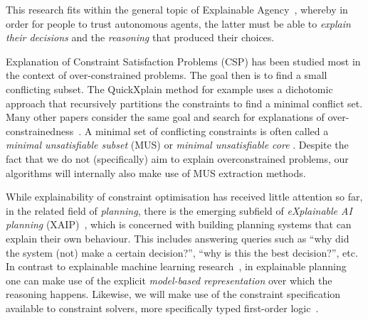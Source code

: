 This research fits within the general topic of Explainable Agency~\cite{langley2017explainable}, whereby in order for people to trust autonomous agents, the latter must be able to \textit{explain their decisions} and the \textit{reasoning} that produced their choices.

Explanation of Constraint Satisfaction Problems (CSP) has been studied most in the context of over-constrained problems.
The goal then is to find a small conflicting subset.
The QuickXplain method \cite{junker2001quickxplain} for example uses a dichotomic approach that recursively partitions the constraints to find a minimal conflict set. Many other papers consider the same goal and search for explanations of over-constrainedness~\cite{leo2017debugging,zeighami2018towards}.
A minimal set of conflicting constraints is often called a \emph{minimal unsatisfiable subset} (MUS) or \emph{minimal unsatisfiable core} \cite{marques2010minimal}. Despite the fact that we do not (specifically) aim to explain overconstrained problems, our algorithms will internally also make use of MUS extraction methods.


While explainability of constraint optimisation has received little attention so far, in the related field of \textit{planning}, there is the emerging subfield of \textit{eXplainable AI planning} (XAIP)~\cite{fox2017explainable}, which is concerned with building planning systems that can explain their own behaviour. This includes answering queries such as ``why did the system (not) make a certain decision?'', ``why is this the best decision?'', etc. In contrast to explainable machine learning research~\cite{guidotti2018survey}, in explainable planning one can make use of the explicit \textit{model-based representation} over which the reasoning happens. Likewise, we will make use of the constraint specification available to constraint solvers, more specifically typed first-order logic~\cite{atcl/Wittocx13}.

